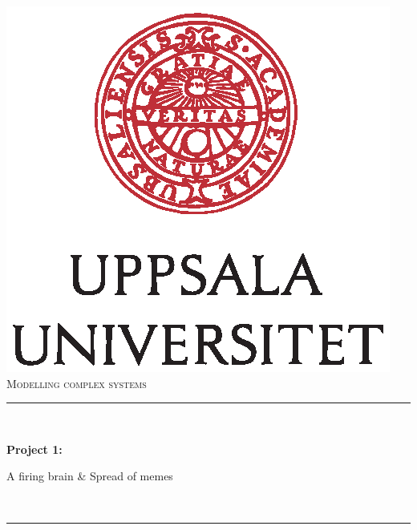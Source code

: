 \documentclass[12pt]{article}
\begin{document}
\begin{titlepage}

\newcommand{\HRule}{\rule{\linewidth}{0.5mm}} %

\center %
 

\includegraphics{UU_logo.eps}\\[0.5cm] %
 
\textsc{\Large Modelling complex systems}\\[0.5cm] %



\HRule \\[0.4cm]
{\huge \bfseries Project 1: \par A firing brain \& Spread of memes }\\[0.4cm] %
\HRule \\[1.5cm]
 

\end{titlepage}
\end{document}
